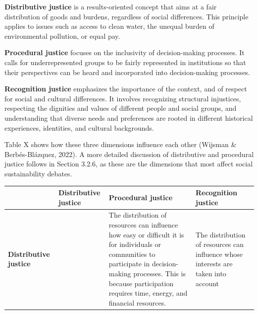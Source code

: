 \documentclass[
  a4paper,
  openany]{book}
\begin{document}
\textbf{Distributive justice} is a results-oriented concept that aims at
a fair distribution of goods and burdens, regardless of social
differences. This principle applies to issues such as access to clean
water, the unequal burden of environmental pollution, or equal pay.

\textbf{Procedural justice} focuses on the inclusivity of
decision-making processes. It calls for underrepresented groups to be
fairly represented in institutions so that their perspectives can be
heard and incorporated into decision-making processes.

\textbf{Recognition justice} emphasizes the importance of the context,
and of respect for social and cultural differences. It involves
recognizing structural injustices, respecting the dignities and values
of different people and social groups, and understanding that diverse
needs and preferences are rooted in different historical experiences,
identities, and cultural backgrounds.

Table X shows how these three dimensions influence each other (Wijsman
\& Berbés-Blázquez, 2022). A more detailed discussion of distributive
and procedural justice follows in Section 3.2.6, as these are the
dimensions that most affect social sustainability debates.

\begin{longtable}[]{@{}
  >{\raggedright\arraybackslash}p{}
  >{\raggedright\arraybackslash}p{}
  >{\raggedright\arraybackslash}p{}
  >{\raggedright\arraybackslash}p{}@{}}
\toprule\noalign{}
\begin{minipage}[b]{\linewidth}\raggedright
\end{minipage} & \begin{minipage}[b]{\linewidth}\raggedright
Distributive justice
\end{minipage} & \begin{minipage}[b]{\linewidth}\raggedright
Procedural justice
\end{minipage} & \begin{minipage}[b]{\linewidth}\raggedright
Recognition justice
\end{minipage} \\
\midrule\noalign{}
\endhead
\bottomrule\noalign{}
\endlastfoot
\textbf{Distributive justice} & & The distribution of resources can
influence how easy or difficult it is for individuals or communities to
participate in decision-making processes. This is because participation
requires time, energy, and financial resources. & The distribution of
resources can influence whose interests are taken into account \\
\end{longtable}
\end{document}
